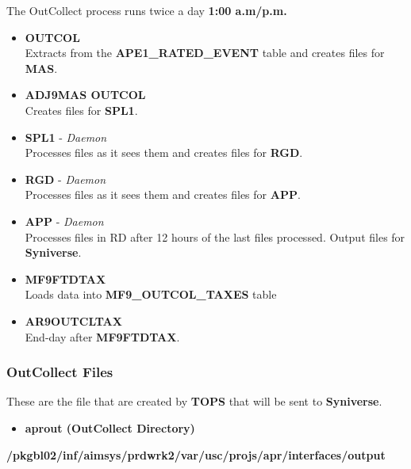 \documentclass[12pt,twoside]{article}
\begin{document}
   The OutCollect process runs twice a day \textbf{1:00 a.m/p.m.}
\small
\begin{itemize}
\item \textbf{OUTCOL} \\ Extracts from the \textbf{APE1\_RATED\_EVENT} table and creates files for \textbf{MAS}.
\item \textbf{ADJ9MAS OUTCOL}\\ Creates files for \textbf{SPL1}.
\item \textbf{SPL1} - \emph{Daemon}\\ Processes files as it sees them and creates files for \textbf{RGD}.
\item \textbf{RGD} - \emph{Daemon}\\ Processes files as it sees them and creates files for \textbf{APP}.
\item \textbf{APP} - \emph{Daemon}\\ Processes files in RD after 12 hours of the last files processed. Output files for \textbf{Syniverse}.
\item \textbf{MF9FTDTAX}\\ Loads data into \textbf{MF9\_OUTCOL\_TAXES} table
\item \textbf{AR9OUTCLTAX}\\ End-day after \textbf{MF9FTDTAX}.
\end{itemize}
\normalsize
\subsubsection{OutCollect Files}
\label{sec-3-6-1}

   These are the file that are created by \textbf{TOPS} that will be sent to \textbf{Syniverse}.
\begin{itemize}
\item \textbf{aprout (OutCollect Directory)} \\
\end{itemize}
   \textbf{\//pkgbl02\//inf\//aimsys\//prdwrk2\//var\//usc\//projs\//apr\//interfaces\//output}
\end{document}
